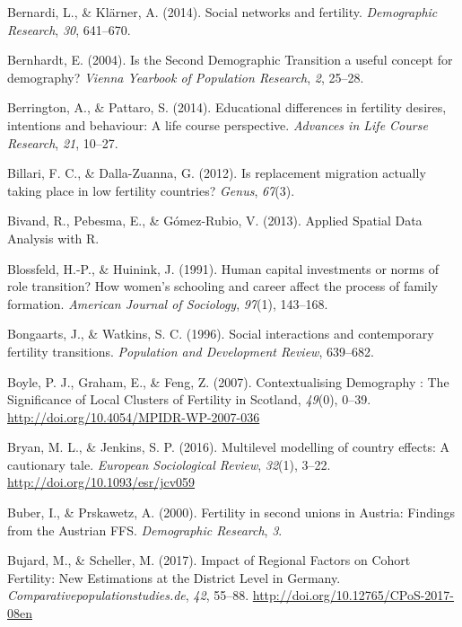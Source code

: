\documentclass[12pt,twoside]{reedthesis}
\begin{document}
\leavevmode\hypertarget{ref-bernardi2014}{}%
Bernardi, L., \& Klärner, A. (2014). Social networks and fertility. \emph{Demographic Research}, \emph{30}, 641--670.

\leavevmode\hypertarget{ref-bernhardt2004}{}%
Bernhardt, E. (2004). Is the Second Demographic Transition a useful concept for demography? \emph{Vienna Yearbook of Population Research}, \emph{2}, 25--28.

\leavevmode\hypertarget{ref-berrington2014}{}%
Berrington, A., \& Pattaro, S. (2014). Educational differences in fertility desires, intentions and behaviour: A life course perspective. \emph{Advances in Life Course Research}, \emph{21}, 10--27.

\leavevmode\hypertarget{ref-billari2012}{}%
Billari, F. C., \& Dalla-Zuanna, G. (2012). Is replacement migration actually taking place in low fertility countries? \emph{Genus}, \emph{67}(3).

\leavevmode\hypertarget{ref-bivand2013}{}%
Bivand, R., Pebesma, E., \& Gómez-Rubio, V. (2013). Applied Spatial Data Analysis with R.

\leavevmode\hypertarget{ref-blossfeld1991}{}%
Blossfeld, H.-P., \& Huinink, J. (1991). Human capital investments or norms of role transition? How women's schooling and career affect the process of family formation. \emph{American Journal of Sociology}, \emph{97}(1), 143--168.

\leavevmode\hypertarget{ref-bongaarts1996}{}%
Bongaarts, J., \& Watkins, S. C. (1996). Social interactions and contemporary fertility transitions. \emph{Population and Development Review}, 639--682.

\leavevmode\hypertarget{ref-boyle2007}{}%
Boyle, P. J., Graham, E., \& Feng, Z. (2007). Contextualising Demography : The Significance of Local Clusters of Fertility in Scotland, \emph{49}(0), 0--39. \url{http://doi.org/10.4054/MPIDR-WP-2007-036}

\leavevmode\hypertarget{ref-bryan2016}{}%
Bryan, M. L., \& Jenkins, S. P. (2016). Multilevel modelling of country effects: A cautionary tale. \emph{European Sociological Review}, \emph{32}(1), 3--22. \url{http://doi.org/10.1093/esr/jcv059}

\leavevmode\hypertarget{ref-buber2000}{}%
Buber, I., \& Prskawetz, A. (2000). Fertility in second unions in Austria: Findings from the Austrian FFS. \emph{Demographic Research}, \emph{3}.

\leavevmode\hypertarget{ref-bujard2017}{}%
Bujard, M., \& Scheller, M. (2017). Impact of Regional Factors on Cohort Fertility: New Estimations at the District Level in Germany. \emph{Comparativepopulationstudies.de}, \emph{42}, 55--88. \url{http://doi.org/10.12765/CPoS-2017-08en}
\end{document}
